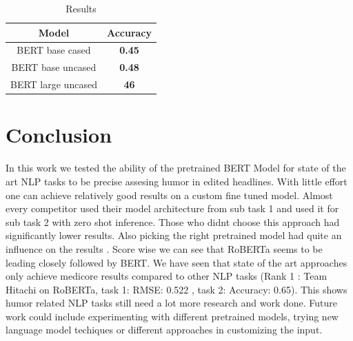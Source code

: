 \documentclass[11pt,a4paper,onecolumn,oneside,notitlepage]{article}
\begin{document}
		
		\begin{table}
			\begin{center}
				\begin{tabular}{|c|c|}
					\hline
					\textbf{Model} &  \textbf{Accuracy}\\
					\hline
					\hline
					BERT base cased & \textbf{0.45}\\
					\hline
					BERT base uncased & \textbf{0.48}\\
					\hline
					BERT large uncased & \textbf{46}\\
					\hline
				\end{tabular}
			\end{center}
			
			\caption{Results}\label{tab1}
		\end{table}				
		

	\section{Conclusion}
	In this work we tested the ability of the pretrained BERT Model for state of the art NLP tasks to be precise assesing humor in edited headlines. With little effort one can achieve relatively good results on a custom fine tuned model.  Almost every competitor used their model architecture from sub task 1 and used it for sub task 2 with zero shot inference. Those who didnt choose this approach had significantly lower results. Also picking the right pretrained model had quite an influence on the results . Score wise we can see that RoBERTa seems to be leading closely followed by BERT.   We have seen that state of the art approaches  only achieve medicore results compared to other NLP tasks (Rank 1 : Team Hitachi on RoBERTa, task 1: RMSE: 0.522 , task 2: Accuracy: 0.65). This shows humor related NLP tasks still need a lot more research and work done.
	Future work could include experimenting with different pretrained models, trying new language model techiques or different approaches in customizing the input.
	\printbibliography
\end{document}
